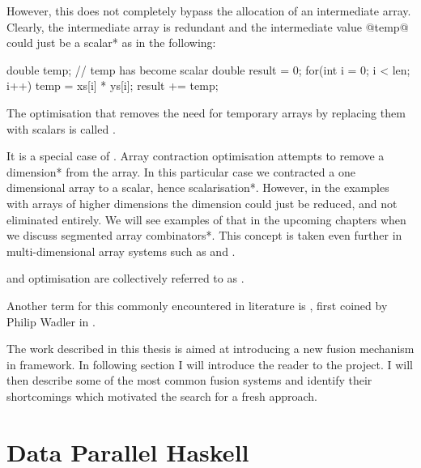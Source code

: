 \documentclass[preamble.tex]{subfiles}
\begin{document}
However, this does not completely bypass the allocation of an intermediate array\iintermediate{}. Clearly, the intermediate array is redundant and the intermediate value @temp@ could just be a \*scalar* as in the following:


\begin{ccode}
double temp; // temp has become scalar
double result = 0;
for(int i = 0; i < len; i++) {
	temp = xs[i] * ys[i];
	result += temp;
}
\end{ccode}


\begin{bluebox}
The optimisation that removes the need for temporary arrays by replacing them with scalars is called .
\end{bluebox}


It is a special case of . Array contraction optimisation attempts to remove a \*dimension* from the array. In this particular case we contracted a one dimensional array to a scalar, hence \*scalarisation*. However, in the examples with arrays of higher dimensions the dimension could just be reduced, and not eliminated entirely. We will see examples of that in the upcoming chapters when we discuss \*segmented array combinators*\isegmented. This concept is taken even further in multi-dimensional array systems such as  \cite{KCL+10} and  \cite{CKL+11}.


\begin{bluebox}
 and  optimisation are collectively referred to as .
\end{bluebox}


Another term for this commonly encountered in literature is , first coined by Philip Wadler in \cite{Wad90}.

The work described in this thesis is aimed at introducing a new fusion mechanism in \idph{} framework. In following section I will introduce the reader to the \DPH project. I will then describe some of the most common fusion systems and identify their shortcomings which motivated the search for a fresh approach.



\clearpage

\section{Data Parallel Haskell}
\label{sec:DPH}
\end{document}
